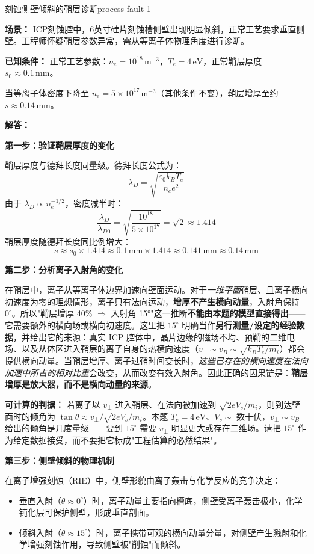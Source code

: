 \documentclass[12pt,a4paper,openany,oneside]{book}
\newcommand{\eps}{\varepsilon}
\newcommand{\difficulty}[1]{\marginnote{\hfill\textcolor{coverMid!80}{\rule[-0.1em]{2pt}{0.9em}}\,\textcolor{coverMid}{\footnotesize\textbf{[#1]}}}}
\begin{document}
\begin{example}{刻蚀侧壁倾斜的鞘层诊断}{process-fault-1}
\difficulty{应用}

\textbf{场景：}
ICP刻蚀腔中，6英寸硅片刻蚀槽侧壁出现明显倾斜，正常工艺要求垂直侧壁。工程师怀疑鞘层参数异常，需从等离子体物理角度进行诊断。

\textbf{已知条件：}
正常工艺参数：$n_e = 10^{18}\,\mathrm{m}^{-3}$，$T_e = 4\,\mathrm{eV}$，正常鞘层厚度 $s_0 \approx 0.1\,\mathrm{mm}$。

当等离子体密度下降至 $n_e = 5\times 10^{17}\,\mathrm{m}^{-3}$（其他条件不变），鞘层增厚至约 $s \approx 0.14\,\mathrm{mm}$。

\tcblower
\textbf{解答：}

\textbf{第一步：验证鞘层厚度的变化}

鞘层厚度与德拜长度同量级。德拜长度公式为：
\[
\lambda_D = \sqrt{\frac{\eps_0 k_B T_e}{n_e e^2}}
\]
由于 $\lambda_D \propto n_e^{-1/2}$，密度减半时：
\[
\frac{\lambda_D}{\lambda_{D0}} = \sqrt{\frac{10^{18}}{5\times 10^{17}}} = \sqrt{2} \approx 1.414
\]
鞘层厚度随德拜长度同比例增大：
\[
s \approx s_0 \times 1.414 \approx 0.1\,\mathrm{mm} \times 1.414 \approx 0.141\,\mathrm{mm} \approx 0.14\,\mathrm{mm}
\]

\textbf{第二步：分析离子入射角的变化}

在鞘层中，离子从等离子体边界加速向壁面运动。对于\emph{一维平面}鞘层、且离子横向初速度为零的理想情形，离子只有法向运动，\textbf{增厚不产生横向动量}，入射角保持 $0^\circ$。所以"鞘层增厚 40\% $\Rightarrow$ 入射角 15°"这一推断\textbf{不能由本题的模型直接得出}——它需要额外的横向场或横向初速度。这里把 $15^\circ$ 明确当作\textbf{另行测量/设定的经验数据}，并给出它的来源：真实 ICP 腔体中，晶片边缘的磁场不均、预鞘的二维电场、以及从体区进入鞘层的离子自身的热横向速度（$v_\perp\sim v_B\sim\sqrt{k_BT_e/m_i}$）都会提供横向动量。当鞘层增厚、离子过鞘时间变长时，\emph{这些已存在的横向速度在法向加速中所占的相对比重}会改变，从而改变有效入射角。因此正确的因果链是：\textbf{鞘层增厚是放大器，而不是横向动量的来源}。

\textbf{可计算的判据：} 若离子以 $v_\perp$ 进入鞘层、在法向被加速到 $\sqrt{2eV_s/m_i}$，则到达壁面时的倾角为 $\tan\theta\approx v_\perp/\sqrt{2eV_s/m_i}$。本题 $T_e=4\,\mathrm{eV}$、$V_s\sim$ 数十伏，$v_\perp\sim v_B$ 给出的倾角是几度量级——要到 $15^\circ$ 需要 $v_\perp$ 明显更大或存在二维场。请把 $15^\circ$ 作为给定数据接受，而不要把它标成"工程估算的必然结果"。

\textbf{第三步：侧壁倾斜的物理机制}

在离子增强刻蚀（RIE）中，侧壁形貌由离子轰击与化学反应的竞争决定：
\begin{itemize}
    \item 垂直入射（$\theta \approx 0^\circ$）时，离子动量主要指向槽底，侧壁受离子轰击极小，化学钝化层可保护侧壁，形成垂直剖面。
    \item 倾斜入射（$\theta \approx 15^\circ$）时，离子携带可观的横向动量分量，对侧壁产生溅射和化学增强刻蚀作用，导致侧壁被"削蚀"而倾斜。
\end{itemize}


\end{example}
\end{document}
